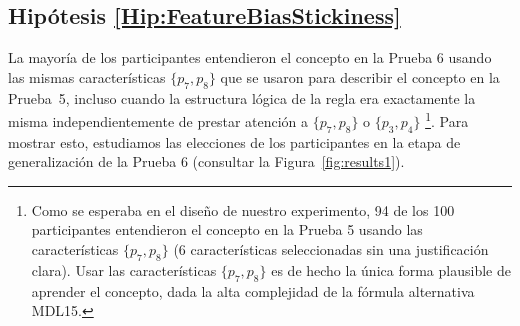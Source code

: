 \subsection{Hipótesis \ref{Hip:FeatureBiasStickiness}}\label{Results:FeatureBiasStickiness}

La mayoría de los participantes entendieron el concepto en la Prueba 6 usando las mismas características $ \{p_7, p_8 \} $ que se usaron para describir el concepto en la Prueba~5, incluso cuando la estructura lógica de la regla era exactamente la misma independientemente de prestar atención a $ \{ p_7, p_8 \} $ o $  \{p_3, p_4 \} $ \footnote{Como se esperaba en el diseño de nuestro experimento, 94 de los 100 participantes entendieron el concepto en la Prueba 5 usando las características $ \{p_7, p_8 \} $ (6 características seleccionadas sin una justificación clara). Usar las características $ \{p_7, p_8 \} $ es de hecho la única forma plausible de aprender el concepto, dada la alta complejidad de la fórmula alternativa MDL15.}. Para mostrar esto, estudiamos las elecciones de los participantes en la etapa de generalización de la Prueba 6 (consultar la Figura~\ref {fig:results1}).


